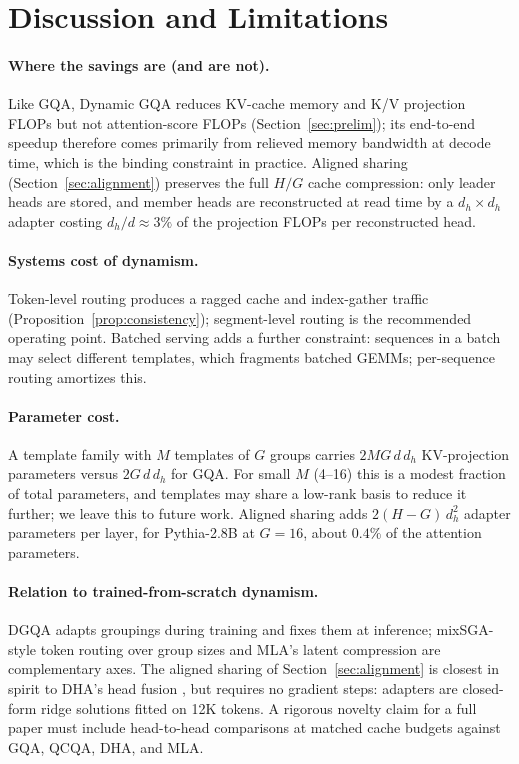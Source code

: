\documentclass{article}
\begin{document}
\section{Discussion and Limitations}
\label{sec:discussion}

\paragraph{Where the savings are (and are not).}
Like GQA, Dynamic GQA reduces KV-cache memory and K/V projection FLOPs but
not attention-score FLOPs (Section~\ref{sec:prelim}); its end-to-end
speedup therefore comes primarily from relieved memory bandwidth at decode
time, which is the binding constraint in practice. Aligned sharing
(Section~\ref{sec:alignment}) preserves the full $H/G$ cache compression:
only leader heads are stored, and member heads are reconstructed at
read time by a $d_h \times d_h$ adapter costing $d_h/d \approx 3\%$ of the
projection FLOPs per reconstructed head.

\paragraph{Systems cost of dynamism.}
Token-level routing produces a ragged cache and index-gather traffic
(Proposition~\ref{prop:consistency}); segment-level routing is the
recommended operating point. Batched serving adds a further constraint:
sequences in a batch may select different templates, which fragments
batched GEMMs; per-sequence routing amortizes this.

\paragraph{Parameter cost.}
A template family with $M$ templates of $G$ groups carries
$2 M G\, d\, d_h$ KV-projection parameters versus $2 G\, d\, d_h$ for GQA.
For small $M$ (4--16) this is a modest fraction of total parameters, and
templates may share a low-rank basis to reduce it further; we leave this to
future work. Aligned sharing adds $2 (H - G)\, d_h^2$ adapter parameters
per layer, for Pythia-2.8B at $G{=}16$, about $0.4\%$ of the attention
parameters.

\paragraph{Relation to trained-from-scratch dynamism.}
DGQA \citep{khan2024beyond} adapts groupings during training and fixes them
at inference; mixSGA-style token routing over group sizes and MLA's latent
compression \citep{deepseek2024v2} are complementary axes. The aligned
sharing of Section~\ref{sec:alignment} is closest in spirit to DHA's
head fusion \citep{chen2024dha}, but requires no gradient steps: adapters
are closed-form ridge solutions fitted on 12K tokens. A rigorous novelty
claim for a full paper must include head-to-head comparisons at matched
cache budgets against GQA, QCQA, DHA, and MLA.
\end{document}
